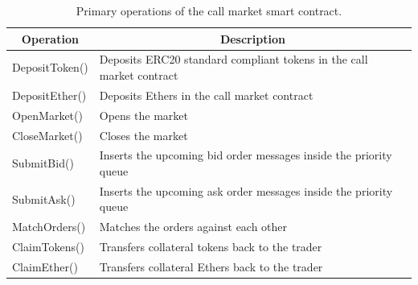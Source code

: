 \begin{table}[]
\begin{tabular}{|l|l|}
\hline
\multicolumn{1}{|c|}{\textbf{Operation}} & \multicolumn{1}{c|}{\textbf{Description}}                            			\\ \hline

	DepositToken()                           & Deposits ERC20 standard compliant tokens in the call market contract \\ \hline
	DepositEther()                           	& Deposits Ethers in the call market contract                         			 \\ \hline
	OpenMarket()                             & Opens the market                                                    					 \\ \hline
	CloseMarket()                            & Closes the market                                                    					\\ \hline
	SubmitBid()                              & Inserts the upcoming bid order messages inside the priority queue    \\ \hline
	SubmitAsk()                              & Inserts the upcoming ask order messages inside the priority queue    \\ \hline
	MatchOrders()                           & Matches the orders against each other                                			\\ \hline
	ClaimTokens()                           & Transfers collateral tokens back to the trader                       			\\ \hline
	ClaimEther()                             & Transfers collateral Ethers back to the trader                       			\\ \hline
\end{tabular}
\caption{\footnotesize{Primary operations of the call market smart contract.}
\label{tab:callmarket_functions}}
\end{table}

